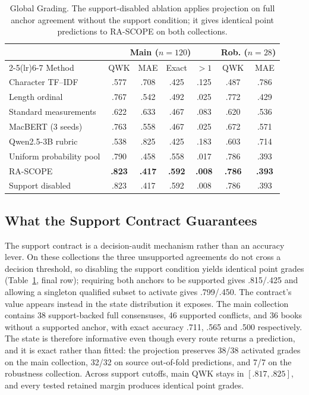 \documentclass[conference]{IEEEtran}
\begin{document}
\begin{table}[t]
\caption{Global Grading. The support-disabled ablation applies projection on
full anchor agreement without the support condition; it gives identical point
predictions to RA-SCOPE on both collections.}
\label{tab_main}
\centering
\footnotesize
\setlength{\tabcolsep}{3.2pt}
\begin{tabular}{lcccccc}
\toprule
& \multicolumn{4}{c}{Main ($n{=}120$)} & \multicolumn{2}{c}{Rob. ($n{=}28$)} \\
\cmidrule(lr){2-5}\cmidrule(lr){6-7}
Method & QWK & MAE & Exact & $>\!1$ & QWK & MAE \\
\midrule
Character TF--IDF      & .577 & .708 & .425 & .125 & .487 & .786 \\
Length ordinal         & .767 & .542 & .492 & .025 & .772 & .429 \\
Standard measurements  & .622 & .633 & .467 & .083 & .620 & .536 \\
MacBERT (3 seeds)      & .763 & .558 & .467 & .025 & .672 & .571 \\
Qwen2.5-3B rubric      & .538 & .825 & .425 & .183 & .603 & .714 \\
Uniform probability pool & .790 & .458 & .558 & .017 & .786 & .393 \\
\midrule
RA-SCOPE               & \textbf{.823} & \textbf{.417} & \textbf{.592} & \textbf{.008} & \textbf{.786} & \textbf{.393} \\
Support disabled       & .823 & .417 & .592 & .008 & .786 & .393 \\
\bottomrule
\end{tabular}
\end{table}

\subsection{What the Support Contract Guarantees}
The support contract is a decision-audit mechanism rather than an accuracy
lever. On these collections the three unsupported agreements do not cross a
decision threshold, so disabling the support condition yields identical point
grades (Table~\ref{tab_main}, final row); requiring both anchors to be supported gives
.815/.425 and allowing a singleton qualified subset to activate gives .799/.450.
The contract's value appears instead in the state distribution it exposes. The
main collection contains 38 support-backed full consensuses, 46 supported
conflicts, and 36 books without a supported anchor, with exact accuracy .711,
.565 and .500 respectively. The state is therefore informative even though
every route returns a prediction, and it is exact rather than fitted: the
projection preserves 38/38 activated grades on the main collection, 32/32 on
source out-of-fold predictions, and 7/7 on the robustness collection. Across
support cutoffs, main QWK stays in $[.817,.825]$, and every tested retained
margin produces identical point grades.
\end{document}
